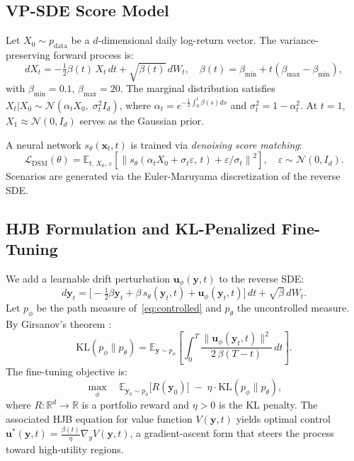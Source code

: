 \documentclass{article}
\newcommand{\R}{\mathbb{R}}
\newcommand{\E}{\mathbb{E}}
\newcommand{\KL}{\mathrm{KL}}
\newcommand{\calN}{\mathcal{N}}
\newcommand{\bu}{\mathbf{u}}
\newcommand{\bx}{\mathbf{x}}
\newcommand{\by}{\mathbf{y}}
\begin{document}
\subsection{VP-SDE Score Model}

Let $X_0 \sim p_\text{data}$ be a $d$-dimensional daily log-return vector. The
variance-preserving forward process \citep{song2021score} is:
\begin{equation}
  dX_t = -\tfrac{1}{2}\beta(t)\,X_t\,dt + \sqrt{\beta(t)}\,dW_t,
  \quad \beta(t) = \beta_{\min} + t(\beta_{\max}-\beta_{\min}),
  \label{eq:vpsde-forward}
\end{equation}
with $\beta_{\min}=0.1$, $\beta_{\max}=20$. The marginal distribution satisfies
$X_t|X_0 \sim \calN(\alpha_t X_0,\;\sigma_t^2 I_d)$, where
$\alpha_t = e^{-\frac{1}{2}\int_0^t \beta(s)ds}$ and $\sigma_t^2 = 1-\alpha_t^2$.
At $t=1$, $X_1\approx\calN(0,I_d)$ serves as the Gaussian prior.

A neural network $s_\theta(\bx_t, t)$ is trained via \emph{denoising score matching}:
\begin{equation}
  \mathcal{L}_\text{DSM}(\theta)
  = \E_{t,\,X_0,\,\varepsilon}\!\left[
      \left\| s_\theta(\alpha_t X_0 + \sigma_t\varepsilon,\, t)
              + \varepsilon/\sigma_t \right\|^2
    \right],\quad \varepsilon\sim\calN(0,I_d).
\end{equation}
Scenarios are generated via the Euler-Maruyama discretization of the reverse SDE.

\subsection{HJB Formulation and KL-Penalized Fine-Tuning}

We add a learnable drift perturbation $\bu_\phi(\by,t)$ to the reverse SDE:
\begin{equation}
  d\by_t = \bigl[-\tfrac{1}{2}\beta \by_t + \beta\, s_\theta(\by_t,t) + \bu_\phi(\by_t,t)\bigr]\,dt + \sqrt{\beta}\,dW_t.
  \label{eq:controlled}
\end{equation}
Let $p_\phi$ be the path measure of~\eqref{eq:controlled} and $p_\theta$ the
uncontrolled measure. By Girsanov's theorem \citep{oksendal2003stochastic}:
\begin{equation}
  \KL(p_\phi \| p_\theta)
  = \E_{\by\sim p_\phi}\!\left[
      \int_0^T \frac{\|\bu_\phi(\by_t,t)\|^2}{2\,\beta(T{-}t)}\,dt
    \right].
  \label{eq:kl-girsanov}
\end{equation}
The fine-tuning objective is:
\begin{equation}
  \max_{\phi}\quad
  \E_{\by_0\sim p_\phi}\!\bigl[R(\by_0)\bigr]
  \;-\; \eta\cdot\KL(p_\phi \| p_\theta),
  \label{eq:finetune-obj}
\end{equation}
where $R:\R^d\to\R$ is a portfolio reward and $\eta>0$ is the KL penalty.
The associated HJB equation for value function $V(\by,t)$ yields optimal control
$\bu^*(\by,t) = \tfrac{\beta(t)}{\eta}\nabla_y V(\by,t)$, a gradient-ascent
form that steers the process toward high-utility regions.
\end{document}

